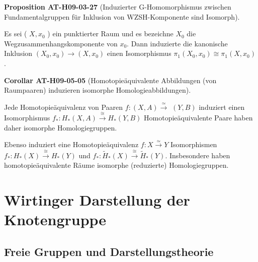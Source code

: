 \documentclass[10pt, letterpaper]{article}
\newcommand{\CustomHeading}[3]{%
  \par\medskip\noindent%
  \textbf{#1 #2} \textnormal{(#3)}.\enskip%
}
\newenvironment{PROP}[2]{\CustomHeading{Proposition}{#1}{#2}}{}
\newenvironment{KORO}[2]{\CustomHeading{Corollar}{#1}{#2}}{}
\begin{document}
\begin{PROP}{AT-H09-03-27}{Induzierter G-Homomorphismus zwischen Fundamentalgruppen für Inklusion von WZSH-Komponente sind Isomorph}
Es sei ( $X, x_{0}$ ) ein punktierter Raum und es bezeichne $X_{0}$ die Wegzusammenhangskomponente von $x_{0}$. Dann induzierte die kanonische Inklusion $\left(X_{0}, x_{0}\right) \rightarrow\left(X, x_{0}\right)$ einen Isomorphismus $\pi_{1}\left(X_{0}, x_{0}\right) \cong \pi_{1}\left(X, x_{0}\right)$.
\end{PROP}

\begin{KORO}{AT-H09-05-05}{Homotopieäquivalente Abbildungen (von Raumpaaren) induzieren isomorphe Homologieabbildungen}
Jede Homotopieäquivalenz von Paaren $f:(X, A) \xrightarrow{\simeq}$ $(Y, B)$ induziert einen Isomorphismus $f_*: H_*(X, A) \stackrel{\cong}{\rightarrow} H_*(Y, B)$ Homotopieäquivalente Paare haben daher isomorphe Homologiegruppen. 

Ebenso induziert eine Homotopieäquivalenz $f: X \xrightarrow{\simeq} Y$ Isomorphismen $f_*: H_*(X) \xrightarrow{\cong} H_*(Y)$ und $f_*: \tilde{H}_*(X) \stackrel{\cong}{\rightarrow} \tilde{H}_*(Y)$. Insbesondere haben homotopieäquivalente Räume isomorphe (reduzierte) Homologiegruppen.
\end{KORO}

\section{Wirtinger Darstellung der Knotengruppe}

\subsection{Freie Gruppen und Darstellungstheorie}
\end{document}
